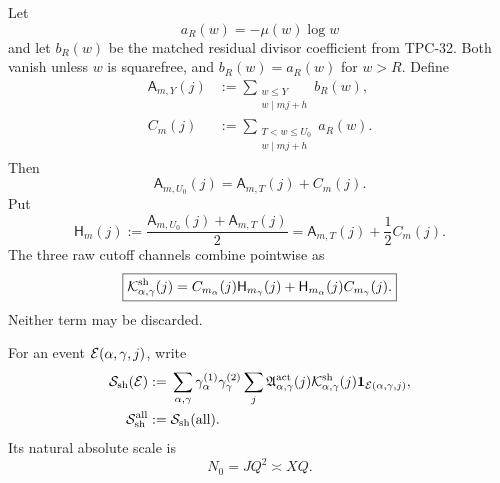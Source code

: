 Let
\begin{equation}
 a_R(w)=-\mu(w)\log w
 \label{eq:tpc33-ultra-coefficient}
\end{equation}
and let \(b_R(w)\) be the matched residual divisor coefficient from
TPC-32.  Both vanish unless \(w\) is squarefree, and
\(b_R(w)=a_R(w)\) for \(w>R\).  Define
\begin{align}
 \mathsf A_{m,Y}(j)
 &:=\sum_{\substack{w\le Y\\w\mid mj+h}}b_R(w),
 \label{eq:tpc33-raw-prefix}\\
 C_m(j)
 &:=\sum_{\substack{T<w\le U_0\\w\mid mj+h}}a_R(w).
 \label{eq:tpc33-ultra-increment}
\end{align}
Then
\begin{equation}
 \mathsf A_{m,U_0}(j)=\mathsf A_{m,T}(j)+C_m(j).
 \label{eq:tpc33-prefix-increment}
\end{equation}
Put
\begin{equation}
 \mathsf H_m(j)
 :=\frac{\mathsf A_{m,U_0}(j)+\mathsf A_{m,T}(j)}2
 =\mathsf A_{m,T}(j)+\frac12C_m(j).
 \label{eq:tpc33-half-prefix}
\end{equation}
The three raw cutoff channels combine pointwise as
\begin{equation}
 \boxed{
 \mathcal K^{\rm sh}_{\alpha,\gamma}(j)
 =C_{m_\alpha}(j)\mathsf H_{m_\gamma}(j)
  +\mathsf H_{m_\alpha}(j)C_{m_\gamma}(j).}
 \label{eq:tpc33-matched-polarization}
\end{equation}
Neither term may be discarded.

For an event \(\mathcal E(\alpha,\gamma,j)\), write
\begin{align}
 \mathcal S_{\rm sh}(\mathcal E)
 :={}&\sum_{\alpha,\gamma}
 \gamma_\alpha^{(1)}\gamma_\gamma^{(2)}
 \sum_j\mathfrak A_{\alpha,\gamma}^{\rm act}(j)
 \mathcal K^{\rm sh}_{\alpha,\gamma}(j)
 \mathbf 1_{\mathcal E(\alpha,\gamma,j)},
 \label{eq:tpc33-physical-functional}\\
 \mathcal S_{\rm sh}^{\rm all}
 :={}&\mathcal S_{\rm sh}(\text{all}).
 \label{eq:tpc33-full-shell}
\end{align}
Its natural absolute scale is
\begin{equation}
 N_0=JQ^2\asymp XQ.
 \label{eq:tpc33-natural-scale}
\end{equation}

